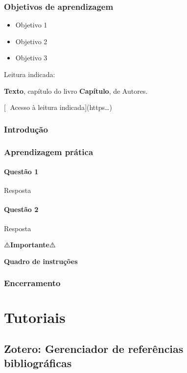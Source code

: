 \documentclass[
  letterpaper,
  DIV=11,
  numbers=noendperiod]{scrreprt}
\providecommand{\tightlist}{%
  \setlength{\itemsep}{0pt}\setlength{\parskip}{0pt}}
\begin{document}
\section{Objetivos de aprendizagem}\label{objetivos-de-aprendizagem-6}

\begin{itemize}
\tightlist
\item
  Objetivo 1
\item
  Objetivo 2
\item
  Objetivo 3
\end{itemize}

\label{Leitura}
Leitura indicada:

\textbf{Texto}, capítulo do livro \textbf{Capítulo}, de Autores.

{[}🔗 Acesso à leitura indicada{]}(https\ldots)

\section{Introdução}\label{introduuxe7uxe3o-5}

\section{Aprendizagem prática}\label{aprendizagem-pruxe1tica-8}

\subsection{Questão 1}\label{questuxe3o-1-4}

Resposta

\subsection{Questão 2}\label{questuxe3o-2-3}

Resposta

⚠️\textbf{Importante}⚠️

\textbf{Quadro de instruções}

\section{Encerramento}\label{encerramento}

\part{Tutoriais}

\chapter{Zotero: Gerenciador de referências
bibliográficas}\label{zotero-gerenciador-de-referuxeancias-bibliogruxe1ficas}
\end{document}
